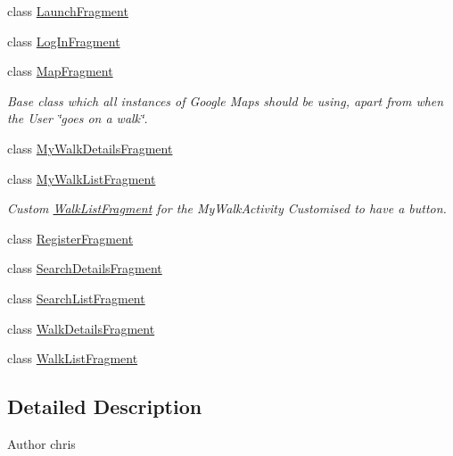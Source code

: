 \begin{DoxyCompactItemize}
\item 
class \hyperlink{classuk_1_1ac_1_1swan_1_1digitaltrails_1_1fragments_1_1_launch_fragment}{Launch\+Fragment}
\item 
class \hyperlink{classuk_1_1ac_1_1swan_1_1digitaltrails_1_1fragments_1_1_log_in_fragment}{Log\+In\+Fragment}
\item 
class \hyperlink{classuk_1_1ac_1_1swan_1_1digitaltrails_1_1fragments_1_1_map_fragment}{Map\+Fragment}
\begin{DoxyCompactList}\small\item\em Base class which all instances of Google Maps should be using, apart from when the User \char`\"{}goes on a walk\char`\"{}. \end{DoxyCompactList}\item 
class \hyperlink{classuk_1_1ac_1_1swan_1_1digitaltrails_1_1fragments_1_1_my_walk_details_fragment}{My\+Walk\+Details\+Fragment}
\item 
class \hyperlink{classuk_1_1ac_1_1swan_1_1digitaltrails_1_1fragments_1_1_my_walk_list_fragment}{My\+Walk\+List\+Fragment}
\begin{DoxyCompactList}\small\item\em Custom \hyperlink{classuk_1_1ac_1_1swan_1_1digitaltrails_1_1fragments_1_1_walk_list_fragment}{Walk\+List\+Fragment} for the My\+Walk\+Activity Customised to have a button. \end{DoxyCompactList}\item 
class \hyperlink{classuk_1_1ac_1_1swan_1_1digitaltrails_1_1fragments_1_1_register_fragment}{Register\+Fragment}
\item 
class \hyperlink{classuk_1_1ac_1_1swan_1_1digitaltrails_1_1fragments_1_1_search_details_fragment}{Search\+Details\+Fragment}
\item 
class \hyperlink{classuk_1_1ac_1_1swan_1_1digitaltrails_1_1fragments_1_1_search_list_fragment}{Search\+List\+Fragment}
\item 
class \hyperlink{classuk_1_1ac_1_1swan_1_1digitaltrails_1_1fragments_1_1_walk_details_fragment}{Walk\+Details\+Fragment}
\item 
class \hyperlink{classuk_1_1ac_1_1swan_1_1digitaltrails_1_1fragments_1_1_walk_list_fragment}{Walk\+List\+Fragment}
\end{DoxyCompactItemize}


\subsection{Detailed Description}
\begin{DoxyAuthor}{Author}
chris 
\end{DoxyAuthor}
